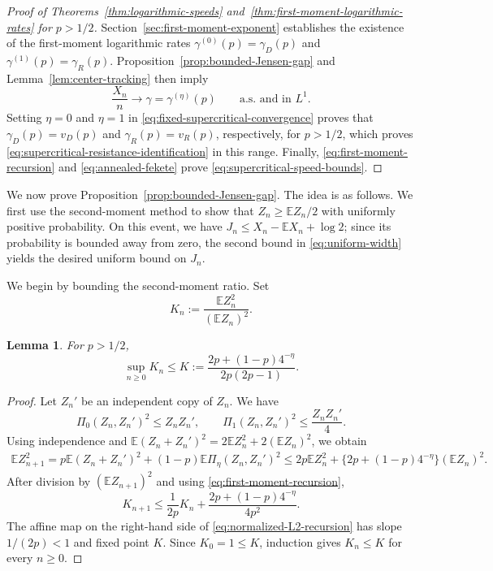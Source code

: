 \documentclass[12pt]{amsart}
\numberwithin{equation}{section}
\theoremstyle{plain}
\newtheorem{lemma}[theorem]{Lemma}
\theoremstyle{definition}
\newcommand{\E}{\mathbb E}
\begin{document}
\begin{proof}[Proof of Theorems~\ref{thm:logarithmic-speeds}
and~\ref{thm:first-moment-logarithmic-rates} for $p>1/2$]
Section~\ref{sec:first-moment-exponent} establishes the existence of the
first-moment logarithmic rates $\gamma^{(0)}(p)=\gamma_D(p)$ and
$\gamma^{(1)}(p)=\gamma_R(p)$.
Proposition~\ref{prop:bounded-Jensen-gap} and
Lemma~\ref{lem:center-tracking} then imply
\begin{equation}
 \frac{X_n}{n}\longrightarrow \gamma=\gamma^{(\eta)}(p)
 \qquad\text{a.s. and in }L^1.
\label{eq:fixed-supercritical-convergence}
\end{equation}
Setting $\eta=0$ and $\eta=1$ in
\eqref{eq:fixed-supercritical-convergence} proves that
$\gamma_D(p)=v_D(p)$ and $\gamma_R(p)=v_R(p)$, respectively, for $p>1/2$,
which proves
\eqref{eq:supercritical-resistance-identification} in this range.  Finally,
\eqref{eq:first-moment-recursion} and
\eqref{eq:annealed-fekete} prove
\eqref{eq:supercritical-speed-bounds}.
\end{proof}

We now prove Proposition~\ref{prop:bounded-Jensen-gap}.  The idea is as follows.
We first use the
second-moment method to show that $Z_n\ge\E Z_n/2$ with uniformly positive
probability.  On this
event, we have $J_n\le X_n-\E X_n+\log2$; since its probability is bounded away from
zero, the second bound in \eqref{eq:uniform-width} yields the desired uniform
bound on $J_n$.

We begin by bounding the second-moment ratio.  Set
\[
 K_n:=\frac{\E Z_n^2}{(\E Z_n)^2}.
\]

\begin{lemma}
\label{lem:normalized-L2}
For $p>1/2$,
\begin{equation*}
\sup_{n\ge0}K_n
 \le K
 :=\frac{2p+(1-p)4^{-\eta}}{2p(2p-1)}.
\end{equation*}
\end{lemma}

\begin{proof}
Let $Z_n'$ be an independent copy of $Z_n$.  We have
\[
 \Pi_0(Z_n,Z_n')^2\le Z_nZ_n',
 \qquad
 \Pi_1(Z_n,Z_n')^2\le\frac{Z_nZ_n'}{4}.
\]
Using independence and
$\E(Z_n+Z_n')^2=2\E Z_n^2+2(\E Z_n)^2$, we obtain
\begin{align*}
    \E Z_{n+1}^2=p\E(Z_n+Z_n')^2+(1-p)\E\Pi_\eta(Z_n,Z_n')^2
    \le 2p\E Z_n^2+\{2p+(1-p)4^{-\eta}\}(\E Z_n)^2.
\end{align*}
After division by $(\E Z_{n+1})^2$ and using
\eqref{eq:first-moment-recursion},
\begin{equation}
 K_{n+1}
 \le\frac1{2p}K_n
 +\frac{2p+(1-p)4^{-\eta}}{4p^2}.
 \label{eq:normalized-L2-recursion}
\end{equation}
The affine map on the right-hand side of
\eqref{eq:normalized-L2-recursion} has slope $1/(2p)<1$ and fixed point $K$.
Since $K_0=1\le K$, induction gives $K_n\le K$ for every $n\ge0$.
\end{proof}
\end{document}

